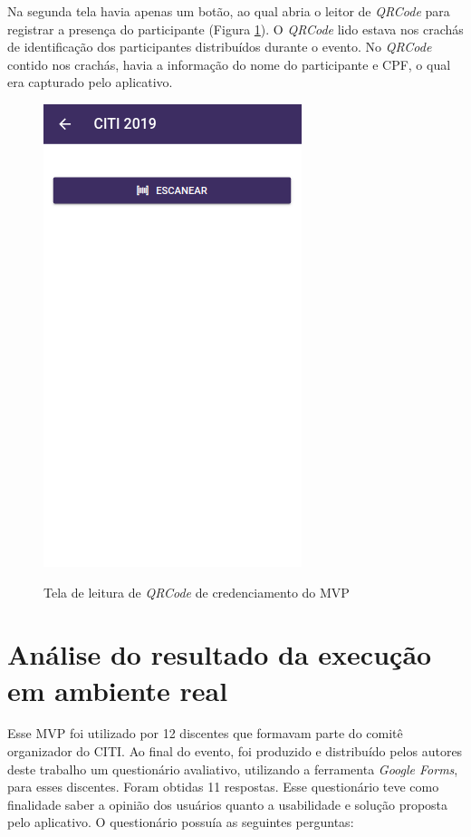 Na segunda tela havia apenas um botão, ao qual abria o leitor de \textit{QRCode} para registrar a presença do participante (Figura \ref{fig:mvp2}). O \textit{QRCode} lido estava nos crachás de identificação dos participantes distribuídos durante o evento. No \textit{QRCode} contido nos crachás, havia a informação do nome do participante e CPF, o qual era capturado pelo aplicativo.

\begin{figure}[H]
    \centering
    \caption{Tela de leitura de \textit{QRCode} de credenciamento do MVP} \includegraphics[scale=0.7]{figuras/mvp2.png}
    \label{fig:mvp2}
\end{figure}

\section{Análise do resultado da execução em ambiente real}

Esse MVP foi utilizado por 12 discentes que formavam parte do comitê organizador do CITI. Ao final do evento, foi produzido e distribuído pelos autores deste trabalho um questionário avaliativo, utilizando a ferramenta \textit{Google Forms}, para esses discentes. Foram obtidas 11 respostas. Esse questionário teve como finalidade saber a opinião dos usuários quanto a usabilidade e solução proposta pelo aplicativo. O questionário possuía as seguintes perguntas:


